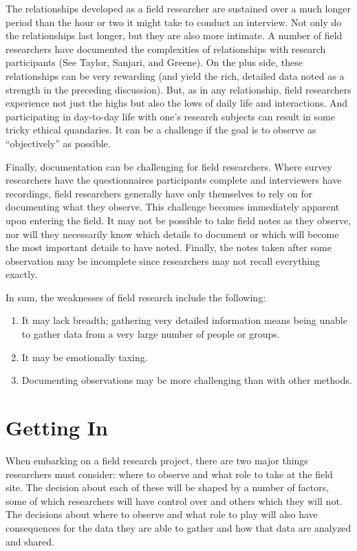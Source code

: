 The relationships developed as a field researcher are sustained over a much longer period than the hour or two it might take to conduct an interview. Not only do the relationships last longer, but they are also more intimate. A number of field researchers have documented the complexities of relationships with research participants (See Taylor\cite{taylor2011intimate}, Sanjari\cite{sanjari2014ethical}, and Greene\cite{greene2014inside}). On the plus side, these relationships can be very rewarding (and yield the rich, detailed data noted as a strength in the preceding discussion). But, as in any relationship, field researchers experience not just the highs but also the lows of daily life and interactions. And participating in day-to-day life with one's research subjects can result in some tricky ethical quandaries. It can be a challenge if the goal is to observe as ``objectively'' as possible.

Finally, documentation can be challenging for field researchers. Where survey researchers have the questionnaires participants complete and interviewers have recordings, field researchers generally have only themselves to rely on for documenting what they observe. This challenge becomes immediately apparent upon entering the field. It may not be possible to take field notes as they observe, nor will they necessarily know which details to document or which will become the most important details to have noted. Finally, the notes taken after some observation may be incomplete since researchers may not recall everything exactly.

In sum, the weaknesses of field research include the following:

\begin{enumerate}
	\item It may lack breadth; gathering very detailed information means being unable to gather data from a very large number of people or groups.
	\item It may be emotionally taxing.
	\item Documenting observations may be more challenging than with other methods.
\end{enumerate}

\section{Getting In}

When embarking on a field research project, there are two major things researchers must consider: where to observe and what role to take at the field site. The decision about each of these will be shaped by a number of factors, some of which researchers will have control over and others which they will not. The decisions about where to observe and what role to play will also have consequences for the data they are able to gather and how that data are analyzed and shared.

